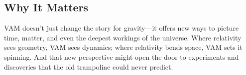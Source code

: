 \subsection*{Why It Matters}

VAM doesn’t just change the story for gravity—it offers new ways to picture time, matter, and even the deepest workings of the universe. Where relativity sees geometry, VAM sees dynamics; where relativity bends space, VAM sets it spinning. And that new perspective might open the door to experiments and discoveries that the old trampoline could never predict.